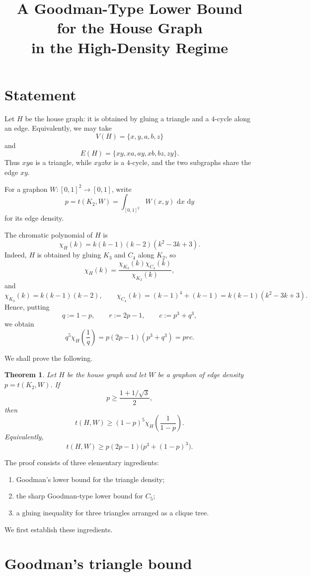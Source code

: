 \documentclass[11pt]{article}
\title{A Goodman-Type Lower Bound for the House Graph\\
in the High-Density Regime}
\author{}
\date{}
\newtheorem{theorem}{Theorem}
\newcommand{\dd}{\,\mathrm{d}}
\begin{document}
\maketitle

\section{Statement}

Let \(H\) be the house graph: it is obtained by gluing a triangle and a
\(4\)-cycle along an edge.  Equivalently, we may take
\[
V(H)=\{x,y,a,b,z\}
\]
and
\[
E(H)
=
\{xy,xa,ay,xb,bz,zy\}.
\]
Thus \(xya\) is a triangle, while \(xy z b x\) is a \(4\)-cycle, and the
two subgraphs share the edge \(xy\).

For a graphon \(W:[0,1]^2\to[0,1]\), write
\[
p=t(K_2,W)
=
\int_{[0,1]^2}W(x,y)\,\dd x\,\dd y
\]
for its edge density.

The chromatic polynomial of \(H\) is
\[
\chi_H(k)
=
k(k-1)(k-2)(k^2-3k+3).
\]
Indeed, \(H\) is obtained by gluing \(K_3\) and \(C_4\) along \(K_2\), so
\[
\chi_H(k)
=
\frac{\chi_{K_3}(k)\chi_{C_4}(k)}{\chi_{K_2}(k)},
\]
and
\[
\chi_{K_3}(k)=k(k-1)(k-2),
\qquad
\chi_{C_4}(k)
=
(k-1)^4+(k-1)
=
k(k-1)(k^2-3k+3).
\]
Hence, putting
\[
q:=1-p,
\qquad
r:=2p-1,
\qquad
c:=p^3+q^3,
\]
we obtain
\[
q^5\chi_H\!\left(\frac1q\right)
=
p(2p-1)(p^3+q^3)
=
prc.
\]

We shall prove the following.

\begin{theorem}\label{thm:main}
Let \(H\) be the house graph and let \(W\) be a graphon of edge density
\(p=t(K_2,W)\).  If
\[
p\ge \frac{1+1/\sqrt3}{2},
\]
then
\[
t(H,W)
\ge
(1-p)^5
\chi_H\!\left(\frac1{1-p}\right).
\]
Equivalently,
\[
\boxed{
t(H,W)
\ge
p(2p-1)
\bigl(p^3+(1-p)^3\bigr).
}
\]
\end{theorem}

The proof consists of three elementary ingredients:

\begin{enumerate}
    \item Goodman's lower bound for the triangle density;
    \item the sharp Goodman-type lower bound for \(C_5\);
    \item a gluing inequality for three triangles arranged as a clique tree.
\end{enumerate}

We first establish these ingredients.

\section{Goodman's triangle bound}
\end{document}
